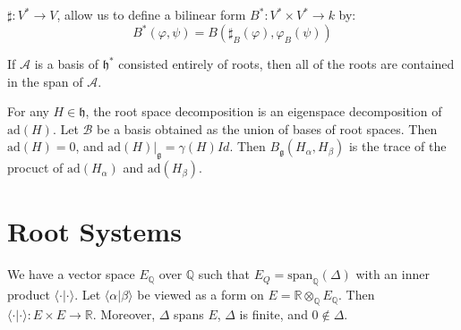     $\sharp:V^{*}\rightarrow{V}$, allow us to define a bilinear form
    $B^{*}:V^{*}\times{V}^{*}\rightarrow{k}$ by:
    \begin{equation}
        B^{*}(\varphi,\psi)=B(\sharp_{B}(\varphi),\varphi_{B}(\psi))
    \end{equation}
    \begin{theorem}
        If $\mathcal{A}$ is a basis of $\mathfrak{h}^{*}$ consisted entirely
        of roots, then all of the roots are contained in the span of
        $\mathcal{A}$.
    \end{theorem}
    For any $H\in\mathfrak{h}$, the root space decomposition is an
    eigenspace decomposition of $\textrm{ad}(H)$. Let $\mathcal{B}$ be a
    basis obtained as the union of bases of root spaces. Then
    $\textrm{ad}(H)=0$, and $\textrm{ad}(H)|_{\mathfrak{g}}=\gamma(H)Id$.
    Then $B_{\mathfrak{g}}(H_{\alpha},H_{\beta})$ is the trace of the
    procuct of $\textrm{ad}(H_{\alpha})$ and $\textrm{ad}(H_{\beta})$.
\section{Root Systems}
    We have a vector space $E_{\mathbb{Q}}$ over $\mathbb{Q}$ such that
    $E_{Q}=\textrm{span}_{\mathbb{Q}}(\Delta)$ with an inner product
    $\langle\cdot|\cdot\rangle$. Let $\langle\alpha|\beta\rangle$ be viewed
    as a form on $E=\mathbb{R}\otimes_{\mathbb{Q}}E_{\mathbb{Q}}$. Then
    $\langle\cdot|\cdot\rangle:E\times{E}\rightarrow\mathbb{R}$. Moreover,
    $\Delta$ spans $E$, $\Delta$ is finite, and $0\notin\Delta$.
